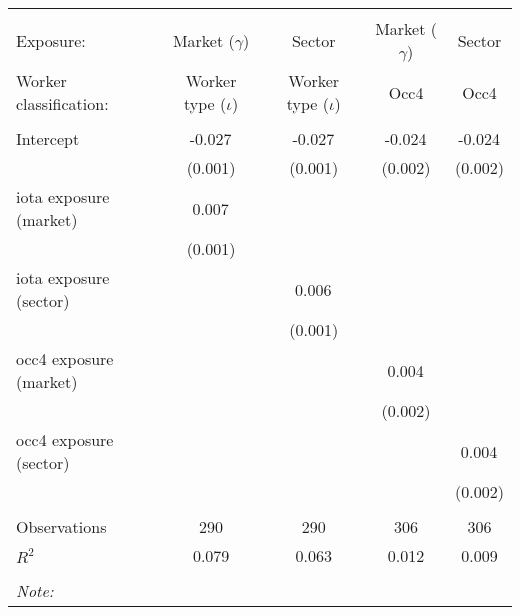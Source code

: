 \begin{tabular}{@{\extracolsep{5pt}}lcccc}
\\[-1.8ex]\hline
\hline \\[-1.8ex]
\hline \\[-1.8ex]
 Exposure: & Market ($\gamma$) & Sector & Market ($\gamma$) & Sector \\
 Worker classification: & Worker type ($\iota$) & Worker type ($\iota$) & Occ4 & Occ4 \\
 \hline &  &  &  &  \\
 Intercept & -0.027$^{}$ & -0.027$^{}$ & -0.024$^{}$ & -0.024$^{}$ \\
  & (0.001) & (0.001) & (0.002) & (0.002) \\
 iota exposure (market) & 0.007$^{}$ & & & \\
  & (0.001) & & & \\
 iota exposure (sector) & & 0.006$^{}$ & & \\
  & & (0.001) & & \\
 occ4 exposure (market) & & & 0.004$^{}$ & \\
  & & & (0.002) & \\
 occ4 exposure (sector) & & & & 0.004$^{}$ \\
  & & & & (0.002) \\
\hline \\[-1.8ex]
 Observations & 290 & 290 & 306 & 306 \\
 $R^2$ & 0.079 & 0.063 & 0.012 & 0.009 \\
\hline
\hline \\[-1.8ex]
\textit{Note:}\end{tabular}